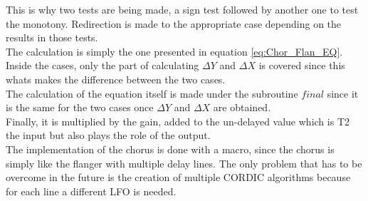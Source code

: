 This is why two tests are being made, a sign test followed by another one to test the monotony. Redirection is made to the appropriate case depending on the results in those tests. \\
The calculation is simply the one presented in equation \ref{eq:Chor_Flan_EQ}. Inside the cases, only the part of calculating $\Delta Y$ and $\Delta X$ is covered since this whats makes the difference between the two cases. \\
The calculation of the equation itself is made under the subroutine $final$ since it is the same for the two cases once $\Delta Y$ and $\Delta X$ are obtained. \\
Finally, it is multiplied by the gain, added to the un-delayed value which is T2 the input but also plays the role of the output. \\
The implementation of the chorus is done with a macro, since the chorus is simply like the flanger with multiple delay lines. The only problem that has to be overcome in the future is the creation of multiple CORDIC algorithms because for each line a different LFO is needed. \\
